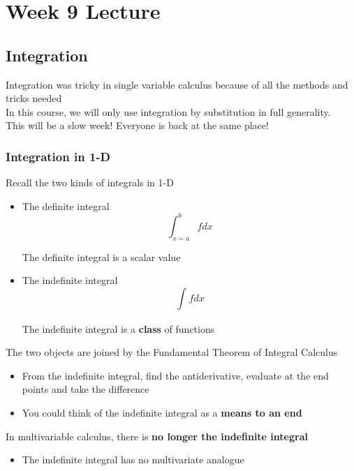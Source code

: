 \chapter{Week 9 Lecture}

\section{Integration}

Integration was tricky in single variable calculus because of all the methods and tricks needed \\

In this course, we will only use integration by substitution in full generality. \\

This will be a slow week! Everyone is back at the same place! \\

\subsection{Integration in 1-D}

Recall the two kinds of integrals in 1-D \\

\begin{itemize}
   \item The definite integral
      \[
         \int_{x = a}^{b} f dx
      \] 

      The definite integral is a scalar value
   \item The indefinite integral
      \[
         \int_{}^{} f dx
      \] 

      The indefinite integral is a \textbf{class} of functions
\end{itemize}

The two objects are joined by the Fundamental Theorem of Integral Calculus 
\begin{itemize}
   \item From the indefinite integral, find the antiderivative, evaluate at the end points and take the difference
   \item You could think of the indefinite integral as a \textbf{means to an end}
\end{itemize}

In multivariable calculus, there is \textbf{no longer the indefinite integral}
\begin{itemize}
   \item The indefinite integral has no multivariate analogue
\end{itemize}

